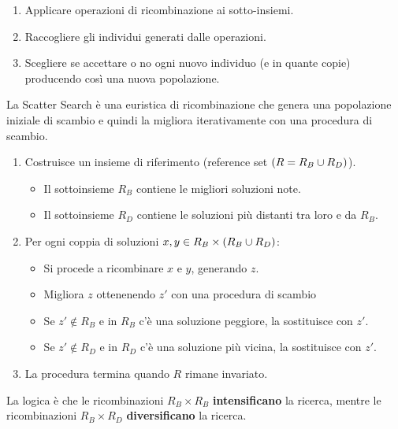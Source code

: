 \documentclass[\main/main.tex]{subfiles}
\begin{document}
\begin{multicols}{2}
\begin{observation}
\begin{enumerate}
\begin{enumerate}
            \item Applicare operazioni di ricombinazione ai sotto-insiemi.
            \item Raccogliere gli individui generati dalle operazioni.
            \item Scegliere se accettare o no ogni nuovo individuo (e in quante copie) producendo così una nuova popolazione.
        \end{enumerate}
    \end{enumerate}
\end{observation}
\begin{definition}
    La Scatter Search è una euristica di ricombinazione che genera una popolazione iniziale di scambio e quindi la migliora iterativamente con una procedura di scambio.
    \begin{enumerate}
        \item Costruisce un insieme di riferimento (reference set \(\left(R = R_B \cup R_D\right)\)).
        \begin{itemize}
            \item Il sottoinsieme \(R_B\) contiene le migliori soluzioni note.
            \item Il sottoinsieme \(R_D\) contiene le soluzioni più distanti tra loro e da \(R_B\).
        \end{itemize}
        \item Per ogni coppia di soluzioni \(x, y \in R_B \times \left(R_B \cup R_D\right)\):
        \begin{itemize}
            \item Si procede a ricombinare \(x\) e \(y\), generando \(z\).
            \item Migliora \(z\) ottenenendo \(z'\) con una procedura di scambio
            \item Se \(z' \not\in R_B\) e in \(R_B\) c'è una soluzione peggiore, la sostituisce con \(z'\).
            \item Se \(z' \not\in R_D\) e in \(R_D\) c'è una soluzione più vicina, la sostituisce con \(z'\).
        \end{itemize}
        \item La procedura termina quando \(R\) rimane invariato.
    \end{enumerate}
    La logica è che le ricombinazioni \(R_B \times R_B\) \textbf{intensificano} la ricerca, mentre le ricombinazioni \(R_B \times R_D\) \textbf{diversificano} la ricerca.
\end{definition}
\begin{definition}

\end{definition}
\end{multicols}
\end{document}
